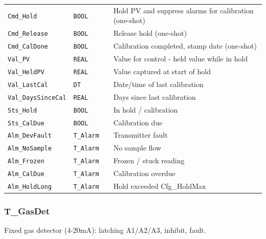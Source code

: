 {\begin{longtable}{@{}>{\raggedright\arraybackslash}p{3.4cm}>{\raggedright\arraybackslash}p{3.3cm}>{\raggedright\arraybackslash}p{1.3cm}>{\raggedright\arraybackslash}p{6.4cm}@{}}
\texttt{Cmd\_Hold} & \texttt{BOOL} &  & Hold PV and suppress alarms for calibration (one-shot) \\
\texttt{Cmd\_Release} & \texttt{BOOL} &  & Release hold (one-shot) \\
\texttt{Cmd\_CalDone} & \texttt{BOOL} &  & Calibration completed, stamp date (one-shot) \\
\texttt{Val\_PV} & \texttt{REAL} &  & Value for control - held value while in hold \\
\texttt{Val\_HeldPV} & \texttt{REAL} &  & Value captured at start of hold \\
\texttt{Val\_LastCal} & \texttt{DT} &  & Date/\allowbreak{}time of last calibration \\
\texttt{Val\_DaysSinceCal} & \texttt{REAL} &  & Days since last calibration \\
\texttt{Sts\_Hold} & \texttt{BOOL} &  & In hold /\allowbreak{} calibration \\
\texttt{Sts\_CalDue} & \texttt{BOOL} &  & Calibration due \\
\texttt{Alm\_DevFault} & \texttt{T\_Alarm} &  & Transmitter fault \\
\texttt{Alm\_NoSample} & \texttt{T\_Alarm} &  & No sample flow \\
\texttt{Alm\_Frozen} & \texttt{T\_Alarm} &  & Frozen /\allowbreak{} stuck reading \\
\texttt{Alm\_CalDue} & \texttt{T\_Alarm} &  & Calibration overdue \\
\texttt{Alm\_HoldLong} & \texttt{T\_Alarm} &  & Hold exceeded Cfg\_HoldMax \\
\bottomrule
\end{longtable}
}
\subsubsection*{T\_GasDet}
\label{app:pclib:tgasdet}
Fixed gas detector (4-20mA): latching A1/\allowbreak{}A2/\allowbreak{}A3, inhibit, fault.

